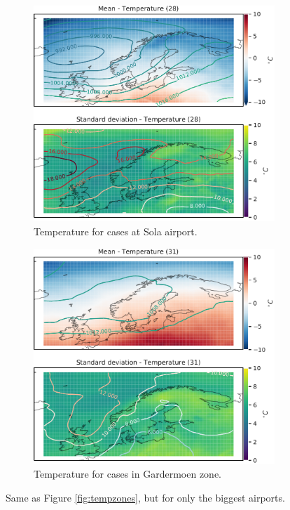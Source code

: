 \begin{figure}[H]
\begin{subfigure}[b]{0.49\textwidth}
         \includegraphics[width=\textwidth]{Figures/TempENZV.pdf}
         \caption{Temperature for cases at Sola airport.}
         \label{fig:ENZVTemperature}
     \end{subfigure}

    \begin{subfigure}[b]{0.5\textwidth}
    \centering
    \includegraphics[width=\textwidth]{Figures/TempENGM.pdf}
    \caption{Temperature for cases in Gardermoen zone.}
    \label{fig:ENGMTemperature}
\end{subfigure}
\caption{Same as Figure \ref{fig:tempzones}, but for only the biggest airports. }
\label{fig:tempairports}
\end{figure}

